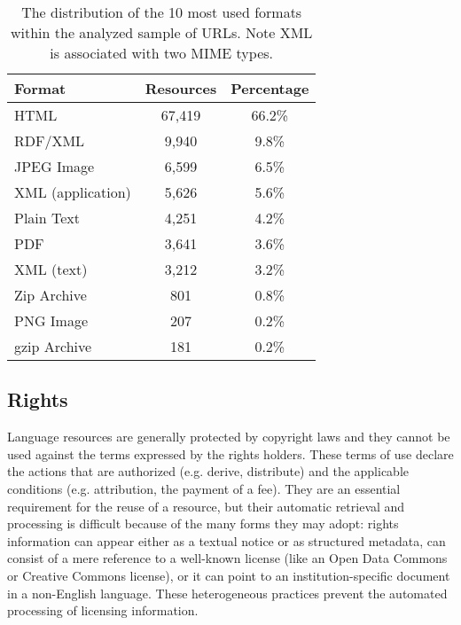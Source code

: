 \documentclass[11pt]{article}
\begin{document}
\begin{table}
    \begin{center}
	\begin{tabular}{l|cc}
            Format   & Resources  & Percentage\\
		
		\hline                                              
                HTML                &	67,419 & 66.2\%\\
                RDF/XML             &	9,940  & 9.8\% \\
                JPEG Image          &   6,599  & 6.5\% \\
                XML (application)   &	5,626  & 5.6\% \\
                Plain Text          & 4,251    & 4.2\% \\
                PDF                 &	3,641  & 3.6\% \\
                XML (text)          & 3,212    & 3.2\% \\
                Zip Archive         &	801    & 0.8\% \\
                PNG Image           & 207      & 0.2\% \\
                gzip Archive        & 181      & 0.2\% \\
	\end{tabular}
    \end{center}
	\caption{\label{tab:formats}The distribution of the 10 most used formats within the
        analyzed sample of URLs. Note XML is associated with two MIME types.}
\end{table}

\subsection{Rights}

Language resources are generally protected by copyright laws and they cannot be
used against the terms expressed by the rights holders. These terms of use
declare the actions that are authorized (e.g. derive, distribute) and the
applicable conditions (e.g. attribution, the payment of a fee). They are an
essential requirement for the reuse of a resource, but their automatic retrieval and processing is
difficult because of the many forms they may adopt: rights information can
appear either as a textual notice or as structured metadata, can consist of a
mere reference to a well-known license (like an Open Data Commons or Creative
Commons license), or it can point to an institution-specific document in a
non-English language. These heterogeneous practices prevent the automated
processing of licensing information. 
\end{document}
